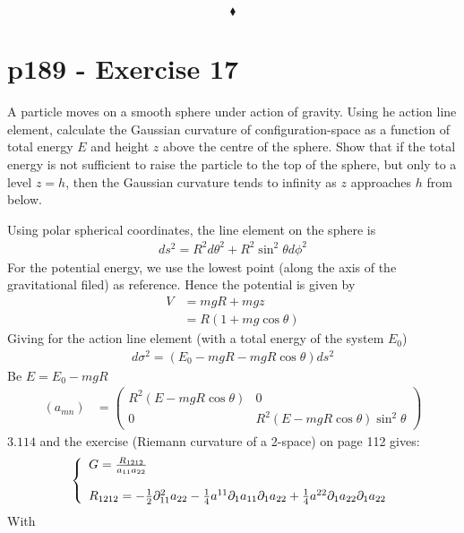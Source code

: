 $$\blacklozenge$$
\newpage

\section{p189 - Exercise 17}
\begin{tcolorbox}
A particle moves on a smooth sphere under action of gravity. Using he action line element, calculate the Gaussian curvature of configuration-space as a function of total energy $E$ and height $z$ above the centre of the sphere. Show that if the total energy is not sufficient to raise the particle to the top of the sphere, but only to a level $z=h$, then the Gaussian curvature tends to infinity as $z$ approaches $h$ from below.
\end{tcolorbox} 
Using polar spherical coordinates, the line element on the sphere is 
\begin{align}
ds^2= R^2d\theta^2 + R^2\sin^2 \theta d\phi^2
\end{align}
For the potential energy, we use the lowest point (along the axis of the gravitational filed) as reference. Hence the potential is given by
\begin{align}
V&= mgR + mgz\\
&= R\left(1+mg\cos\theta\right)
\end{align}
Giving for the action line element (with a total energy of the system $E_0$)
\begin{align}
d\sigma^2 = \left(E_0-mgR-mgR\cos\theta\right)ds^2
\end{align}
Be $E=E_0-mgR$
\begin{align}
\left(a_{mn}\right)&= \left(\begin{array}{cc}
R^2\left(E-mgR\cos\theta\right)&0\\
0&R^2\left(E-mgR\cos\theta\right)\sin^2 \theta 
\end{array}\right)
\end{align}
$\mathbf{3.114}$ and the exercise (Riemann curvature of a 2-space) on page 112 gives:
\begin{align}
\left\{\begin{array}{l}
G= \frac{R_{1212}}{a_{11}a_{22}}\\\\
R_{1212}= -\frac{1}{2}\partial_{11}^2a_{22}-\frac{1}{4}a^{11}\partial_1 a_{11}\partial_1 a_{22}+\frac{1}{4}a^{22}\partial_1 a_{22}\partial_1 a_{22}
\end{array}\right.
\end{align}
With
